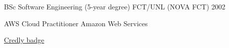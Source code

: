 
\begin{cventries}

  \cventry
  {BSc Software Engineering (5-year degree)} %
  {FCT/UNL (NOVA FCT)} %
  {} %
  {2002} %
  {}

  \cventry
  {AWS Cloud Practitioner} %
  {Amazon Web Services} %
  {} %
  {} %
  {
    \begin{cvitems} %
    \item {\href{https://www.credly.com/badges/c58170f5-3653-4f2a-8d9b-42264249eea8}{Credly badge}}
    \end{cvitems}
  }
\end{cventries}
